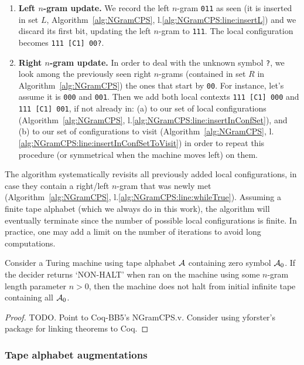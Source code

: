 \begin{enumerate}
    \item \textbf{Left $n$-gram update.} We record the left $n$-gram \texttt{011} as seen (it is inserted in set $L$, Algorithm~\ref{alg:NGramCPS}, l.\ref{alg:NGramCPS:line:insertL}) and we discard its first bit, updating the left $n$-gram to \texttt{111}. The local configuration becomes \texttt{111 [C1] 00?}.
    \item \textbf{Right $n$-gram update.} In order to deal with the unknown symbol \texttt{?}, we look among the previously seen right $n$-grams (contained in set $R$ in Algorithm~\ref{alg:NGramCPS}) the ones that start by \texttt{00}. For instance, let's assume it is \texttt{000} and \texttt{001}. Then we add both local contexts \texttt{111 [C1] 000} and \texttt{111 [C1] 001}, if not already in: (a) to our set of local configurations (Algorithm~\ref{alg:NGramCPS}, l.\ref{alg:NGramCPS:line:insertInConfSet}), and (b) to our set of configurations to visit (Algorithm~\ref{alg:NGramCPS}, l.\ref{alg:NGramCPS:line:insertInConfSetToVisit}) in order to repeat this procedure (or symmetrical when the machine moves left) on them.
\end{enumerate}

The algorithm systematically revisits all previously added local configurations, in case they contain a right/left $n$-gram that was newly met (Algorithm~\ref{alg:NGramCPS}, l.\ref{alg:NGramCPS:line:whileTrue}). Assuming a finite tape alphabet (which we always do in this work), the algorithm will eventually terminate since the number of possible local configurations is finite. In practice, one may add a limit on the number of iterations to avoid long computations.

\begin{theorem}
    Consider a Turing machine using tape alphabet $\mathcal{A}$ containing zero symbol $\mathcal{A}_0$. If the \ngramcps decider returns `NON-HALT' when ran on the machine using some $n$-gram length parameter $n > 0$, then the machine does not halt from initial infinite tape containing all $\mathcal{A}_0$.
\end{theorem}
\begin{proof}
    TODO. Point to Coq-BB5's NGramCPS.v. Consider using yforster's package for linking theorems to Coq.
\end{proof}



\subsubsection{Tape alphabet augmentations}\label{sec:n-gramCPS:augmentations}

